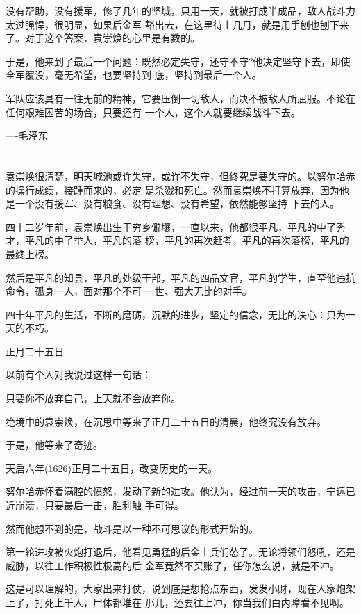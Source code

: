 \documentclass[11pt,a4paper,onecolumn]{article}
\begin{document}
没有帮助，没有援军，修了几年的坚城，只用一天，就被打成半成品，敌人战斗力太过强悍，很明显，如果后金军
豁出去，在这里待上几月，就是用手刨也刨下来了。对于这个答案，袁崇焕的心里是有数的。

于是，他来到了最后一个问题：既然必定失守，还守不守?他决定坚守下去，即使全军覆没，毫无希望，也要坚持到
底，坚持到最后一个人。

军队应该具有一往无前的精神，它要压倒一切敌人，而决不被敌人所屈服。不论在任何艰难困苦的场合，只要还有
一个人，这个人就要继续战斗下去。

----毛泽东

\section[\thesection]{}

袁崇焕很清楚，明天城池或许失守，或许不失守，但终究是要失守的。以努尔哈赤的操行成绩，接踵而来的，必定
是杀戮和死亡。然而袁崇焕不打算放弃，因为他是一个没有援军、没有粮食、没有理想、没有希望，依然能够坚持
下去的人。

四十二岁年前，袁崇焕出生于穷乡僻壤，一直以来，他都很平凡，平凡的中了秀才，平凡的中了举人，平凡的落
榜，平凡的再次赶考，平凡的再次落榜，平凡的最终上榜。

然后是平凡的知县，平凡的处级干部，平凡的四品文官，平凡的学生，直至他违抗命令，孤身一人，面对那个不可
一世、强大无比的对手。

四十年平凡的生活，不断的磨砺，沉默的进步，坚定的信念，无比的决心：只为一天的不朽。

正月二十五日

以前有个人对我说过这样一句话：

只要你不放弃自己，上天就不会放弃你。

绝境中的袁崇焕，在沉思中等来了正月二十五日的清晨，他终究没有放弃。

于是，他等来了奇迹。

天启六年(1626)正月二十五日，改变历史的一天。

努尔哈赤怀着满腔的愤怒，发动了新的进攻。他认为，经过前一天的攻击，宁远已近崩溃，只要最后一击，胜利触
手可得。

然而他想不到的是，战斗是以一种不可思议的形式开始的。

第一轮进攻被火炮打退后，他看见勇猛的后金士兵们怂了。无论将领们怒吼，还是威胁，以往工作积极性极高的后
金军竟然不买账了，任你怎么说，就是不冲。

这是可以理解的，大家出来打仗，说到底是想抢点东西，发发小财，现在人家炮架上了，打死上千人，尸体都堆在
那儿，还要往上冲，你当我们白内障看不见啊。
\end{document}
